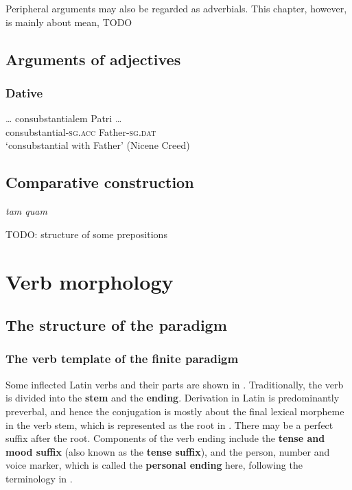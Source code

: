 \documentclass[a4paper, oneside]{report}
\newcommand*{\citesec}[1]{\S~{#1}}
\newcommand*{\concept}[1]{\textbf{#1}}
\newcommand{\form}[1]{\emph{#1}}
\newcommand*{\category}[1]{\textsc{#1}}
\newcommand{\translate}[1]{`#1'}
\begin{document}
Peripheral arguments may also be regarded as adverbials.
This chapter, however, is mainly about mean, TODO

\section{Arguments of adjectives}

\subsection{Dative}

\begin{exe}
    \ex \gll \dots {} consubstantialem Patri \dots \\
    {} consubstantial-\category{sg.acc} Father-\category{sg.dat} \\
    \glt \translate{consubstantial with Father} (Nicene Creed)
\end{exe}

\section{Comparative construction}

\form{tam quam}

TODO: structure of some prepositions


\chapter{Verb morphology}\label{chap:verb}

\section{The structure of the paradigm}

\subsection{The verb template of the finite paradigm}\label{sec:verb.finite.paradigm}

Some inflected Latin verbs and their parts are shown in .
Traditionally, the verb is divided 
into the \concept{stem} and the \concept{ending}.
Derivation in Latin is predominantly preverbal,
and hence the conjugation is mostly about the final lexical morpheme in the verb stem,
which is represented as the root in .
There may be a perfect suffix after the root.
Components of the verb ending include 
the \concept{tense and mood suffix} (also known as the \concept{tense suffix}),
and the person, number and voice marker,
which is called the \concept{personal ending} here, 
following the terminology in \citet[\citesec{165}]{allen1903allen}.
\end{document}
